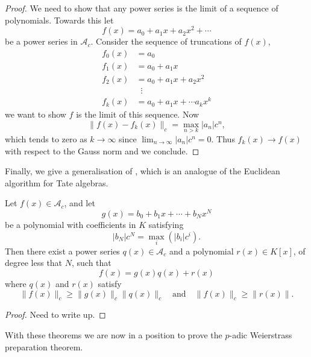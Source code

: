 \begin{proof}
    We need to show that any power series is the limit of a sequence of polynomials. Towards this
    let
    \[
    f(x) = a_0 + a_1x+a_2x^2 + \cdots
    \]
    be a power series in $\mathcal{A}_c$.
    Consider the sequence of truncations of $f(x)$,
    \begin{align*}
        f_0(x) &= a_0 \\
        f_1(x) &= a_0 + a_1 x \\
        f_2(x) &= a_0 + a_1 x + a_2 x^2 \\
        & \; \; \vdots \\
        f_k(x) &= a_0 + a_1 x + \cdots a_k x^k
    \end{align*}
    we want to show $f$ is the limit of this sequence. Now
    \[
    \| f(x) - f_k (x) \|_c = \max_{n>k} |a_n|c^n,
    \]
    which tends to zero as $k \to \infty$ since $\lim_{n \to \infty} |a_n|c^n = 0$. Thus
    $f_k (x) \to f(x)$ with respect to the Gauss norm and we conclude.
\end{proof}

Finally, we give a generalisation of \cite[Lemma~7.2.9]{Gouvea}, which is an analogue of the
Euclidean algorithm for Tate algebras.

\begin{lemma} \label{euclidalgorithm}
    Let $f(x) \in \mathcal{A}_c$, and let
    \[
    g(x) = b_0 + b_1 x + \cdots + b_N x^N
    \]
    be a polynomial with coefficients in $K$ satisfying
    \[
    \lvert b_N \rvert  c^N= \max_i (\lvert b_i \rvert c^i).
    \]
    Then there exist a power series $q(x) \in \mathcal{A}_c$ and a polynomial $r(x) \in K[x]$,
    of degree less that $N$, such that
    \[
    f(x) = g(x) q(x) + r(x)
    \]
    where $q(x)$ and $r(x)$ satisfy
    \[
    \|f(x) \|_c \geq \|g(x)\|_c \| q(x)\|_c \quad \text{and} \quad \|f(x) \|_c \geq \| r(x) \|.
    \]
    \end{lemma}

\begin{proof}
    Need to write up.
\end{proof}

With these theorems we are now in a position to prove the $p$-adic Weierstrass preparation theorem.

